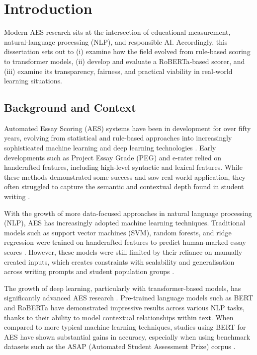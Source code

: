\documentclass[10pt]{report}
\begin{document}
\chapter{Introduction}
Modern AES research sits at the intersection of educational measurement, natural‑language processing (NLP), and responsible AI.  Accordingly, this dissertation sets out to (i) examine how the field evolved from rule‑based scoring to transformer models,  (ii) develop and evaluate a RoBERTa‑based scorer, and (iii) examine its transparency, fairness, and practical viability in real‑world learning situations.

\section{Background and Context}

Automated Essay Scoring (AES) systems have been in development for over fifty years, evolving from statistical and rule-based approaches into increasingly sophisticated machine learning and deep learning technologies \parencite{zhang2020automated}. Early developments such as Project Essay Grade (PEG) \parencite{page1966imminence} and e-rater \parencite{e-rater2006} relied on handcrafted features, including high-level syntactic and lexical features. While these methods demonstrated some success and saw real-world application, they often struggled to capture the semantic and contextual depth found in student writing \parencite{shermis2013handbook}.

With the growth of more data-focused approaches in natural language processing (NLP), AES has increasingly adopted machine learning techniques. Traditional models such as support vector machines (SVM), random forests, and ridge regression were trained on handcrafted features to predict human-marked essay scores \parencite{shermis2013handbook}. However, these models were still limited by their reliance on manually created inputs, which creates constraints with scalability and generalisation across writing prompts and student population groups \parencite{zhang2020automated}.

The growth of deep learning, particularly with transformer-based models, has significantly advanced AES research \parencite{vaswani2017attention}. Pre-trained language models such as BERT\parencite{devlin2019bert} and RoBERTa \parencite{liu2019roberta} have demonstrated impressive results across various NLP tasks, thanks to their ability to model contextual relationships within text. When compared to more typical machine learning techniques, studies using BERT for AES have shown substantial gains in accuracy, especially when using benchmark datasets such as the ASAP (Automated Student Assessment Prize) corpus \parencite{taghipour2016neural}.
\end{document}
